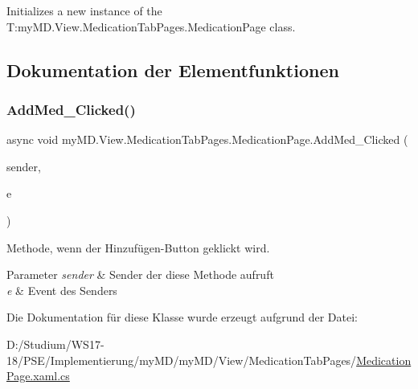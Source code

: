 Initializes a new instance of the T\+:my\+M\+D.\+View.\+Medication\+Tab\+Pages.\+Medication\+Page class. 



\subsection{Dokumentation der Elementfunktionen}
\mbox{\label{classmy_m_d_1_1_view_1_1_medication_tab_pages_1_1_medication_page_a8f462e0f3c47fc90db5745284f1186e8}} 
\subsubsection{\texorpdfstring{Add\+Med\+\_\+\+Clicked()}{AddMed\_Clicked()}}
{\footnotesize\ttfamily async void my\+M\+D.\+View.\+Medication\+Tab\+Pages.\+Medication\+Page.\+Add\+Med\+\_\+\+Clicked (\begin{DoxyParamCaption}\item[{object}]{sender,  }\item[{Event\+Args}]{e }\end{DoxyParamCaption})}



Methode, wenn der Hinzufügen-\/\+Button geklickt wird. 


\begin{DoxyParams}{Parameter}
{\em sender} & Sender der diese Methode aufruft\\
\hline
{\em e} & Event des Senders\\
\hline
\end{DoxyParams}


Die Dokumentation für diese Klasse wurde erzeugt aufgrund der Datei\+:\begin{DoxyCompactItemize}
\item 
D\+:/\+Studium/\+W\+S17-\/18/\+P\+S\+E/\+Implementierung/my\+M\+D/my\+M\+D/\+View/\+Medication\+Tab\+Pages/\mbox{\hyperlink{_medication_page_8xaml_8cs}{Medication\+Page.\+xaml.\+cs}}\end{DoxyCompactItemize}
